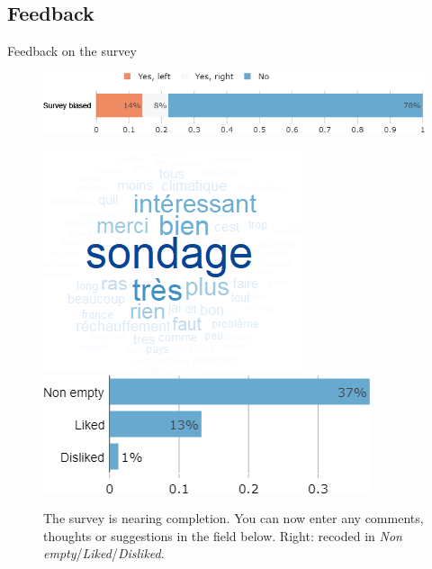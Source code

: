 \begin{framefont}{\small}
\subsection{Feedback}
\begin{frame}{Feedback on the survey}%
\vspace{-.2cm}
\begin{figure}[h!]
\caption{Do you feel that this survey was politically biased?}
\includegraphics[width=.52\paperwidth]{../figures/FR/survey_biased_FR.png} \\
\vspace{.2cm}
\caption{The survey is nearing completion. You can now enter any comments, thoughts or suggestions in the field below. Right: recoded in \textit{Non empty}/\textit{Liked}/\textit{Disliked}.}
\includegraphics[width=.26\paperwidth]{../figures/FR/comment_field_FR.png}
\vspace{.2cm}
\includegraphics[width=.4\paperwidth]{../figures/FR/comment_field_mentions_FR.png}
\end{figure}
\end{frame}


\end{framefont}


